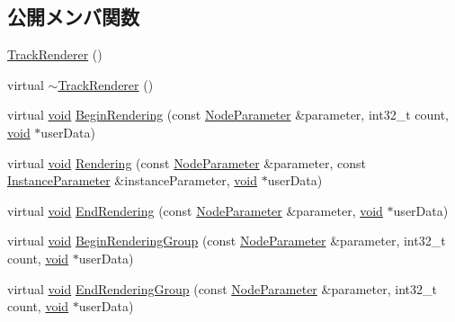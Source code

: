 \subsection*{公開メンバ関数}
\begin{DoxyCompactItemize}
\item 
\mbox{\hyperlink{class_effekseer_1_1_track_renderer_a9517f40758eac1a40a06ef05875a9acb}{Track\+Renderer}} ()
\item 
virtual \mbox{\hyperlink{class_effekseer_1_1_track_renderer_a2880354ffae0aeadffa3351968a8a99f}{$\sim$\+Track\+Renderer}} ()
\item 
virtual \mbox{\hyperlink{namespace_effekseer_ab34c4088e512200cf4c2716f168deb56}{void}} \mbox{\hyperlink{class_effekseer_1_1_track_renderer_ac252e85dddf2e8cc34b14dd00ab803b5}{Begin\+Rendering}} (const \mbox{\hyperlink{struct_effekseer_1_1_track_renderer_1_1_node_parameter}{Node\+Parameter}} \&parameter, int32\+\_\+t count, \mbox{\hyperlink{namespace_effekseer_ab34c4088e512200cf4c2716f168deb56}{void}} $\ast$user\+Data)
\item 
virtual \mbox{\hyperlink{namespace_effekseer_ab34c4088e512200cf4c2716f168deb56}{void}} \mbox{\hyperlink{class_effekseer_1_1_track_renderer_a5d99f7a58b254166cf938bc739bbb387}{Rendering}} (const \mbox{\hyperlink{struct_effekseer_1_1_track_renderer_1_1_node_parameter}{Node\+Parameter}} \&parameter, const \mbox{\hyperlink{struct_effekseer_1_1_track_renderer_1_1_instance_parameter}{Instance\+Parameter}} \&instance\+Parameter, \mbox{\hyperlink{namespace_effekseer_ab34c4088e512200cf4c2716f168deb56}{void}} $\ast$user\+Data)
\item 
virtual \mbox{\hyperlink{namespace_effekseer_ab34c4088e512200cf4c2716f168deb56}{void}} \mbox{\hyperlink{class_effekseer_1_1_track_renderer_ad8ad4cbe8cdbbaacc2106c3e689ce579}{End\+Rendering}} (const \mbox{\hyperlink{struct_effekseer_1_1_track_renderer_1_1_node_parameter}{Node\+Parameter}} \&parameter, \mbox{\hyperlink{namespace_effekseer_ab34c4088e512200cf4c2716f168deb56}{void}} $\ast$user\+Data)
\item 
virtual \mbox{\hyperlink{namespace_effekseer_ab34c4088e512200cf4c2716f168deb56}{void}} \mbox{\hyperlink{class_effekseer_1_1_track_renderer_aabda9da7e26531ca02142af951865bcc}{Begin\+Rendering\+Group}} (const \mbox{\hyperlink{struct_effekseer_1_1_track_renderer_1_1_node_parameter}{Node\+Parameter}} \&parameter, int32\+\_\+t count, \mbox{\hyperlink{namespace_effekseer_ab34c4088e512200cf4c2716f168deb56}{void}} $\ast$user\+Data)
\item 
virtual \mbox{\hyperlink{namespace_effekseer_ab34c4088e512200cf4c2716f168deb56}{void}} \mbox{\hyperlink{class_effekseer_1_1_track_renderer_a3f64ad809595ff880d3575ed8345ef0a}{End\+Rendering\+Group}} (const \mbox{\hyperlink{struct_effekseer_1_1_track_renderer_1_1_node_parameter}{Node\+Parameter}} \&parameter, int32\+\_\+t count, \mbox{\hyperlink{namespace_effekseer_ab34c4088e512200cf4c2716f168deb56}{void}} $\ast$user\+Data)
\end{DoxyCompactItemize}


